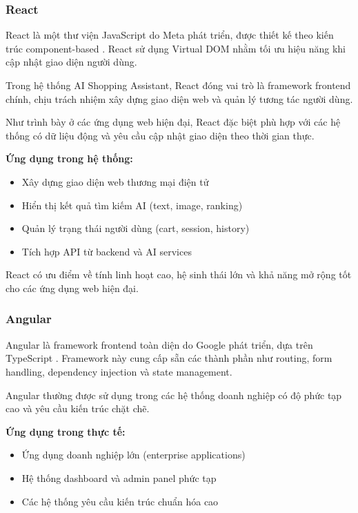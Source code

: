 \subsubsection{React}

React là một thư viện JavaScript do Meta phát triển, được thiết kế theo kiến trúc component-based \textcite{reactdocs2024}. React sử dụng Virtual DOM nhằm tối ưu hiệu năng khi cập nhật giao diện người dùng.

Trong hệ thống AI Shopping Assistant, React đóng vai trò là framework frontend chính, chịu trách nhiệm xây dựng giao diện web và quản lý tương tác người dùng.

Như trình bày ở các ứng dụng web hiện đại, React đặc biệt phù hợp với các hệ thống có dữ liệu động và yêu cầu cập nhật giao diện theo thời gian thực.

\textbf{Ứng dụng trong hệ thống:}
\begin{itemize}
    \item Xây dựng giao diện web thương mại điện tử
    \item Hiển thị kết quả tìm kiếm AI (text, image, ranking)
    \item Quản lý trạng thái người dùng (cart, session, history)
    \item Tích hợp API từ backend và AI services
\end{itemize}

React có ưu điểm về tính linh hoạt cao, hệ sinh thái lớn và khả năng mở rộng tốt cho các ứng dụng web hiện đại.

\subsubsection{Angular}

Angular là framework frontend toàn diện do Google phát triển, dựa trên TypeScript \textcite{angulardocs2024}. Framework này cung cấp sẵn các thành phần như routing, form handling, dependency injection và state management.

Angular thường được sử dụng trong các hệ thống doanh nghiệp có độ phức tạp cao và yêu cầu kiến trúc chặt chẽ.

\textbf{Ứng dụng trong thực tế:}
\begin{itemize}
    \item Ứng dụng doanh nghiệp lớn (enterprise applications)
    \item Hệ thống dashboard và admin panel phức tạp
    \item Các hệ thống yêu cầu kiến trúc chuẩn hóa cao
\end{itemize}

